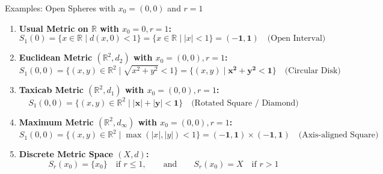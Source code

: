\documentclass[11pt,a4paper]{article}
\begin{document}
\begin{exbox}{Examples: Open Spheres with $x_0 = (0,0)$ and $r = 1$}
\begin{enumerate}
    \item \textbf{Usual Metric on $\mathbb{R}$ with $x_0 = 0, r = 1$:}
    $$S_1(0) = \{ x \in \mathbb{R} \mid d(x, 0) < 1 \} = \{ x \in \mathbb{R} \mid |x| < 1 \} = \mathbf{(-1, 1)} \quad \text{(Open Interval)}$$
    
    \item \textbf{Euclidean Metric $(\mathbb{R}^2, d_2)$ with $x_0 = (0,0), r = 1$:}
    $$S_1(0,0) = \{ (x, y) \in \mathbb{R}^2 \mid \sqrt{x^2 + y^2} < 1 \} = \{ (x, y) \mid \mathbf{x^2 + y^2 < 1} \} \quad \text{(Circular Disk)}$$
    
    \item \textbf{Taxicab Metric $(\mathbb{R}^2, d_1)$ with $x_0 = (0,0), r = 1$:}
    $$S_1(0,0) = \{ (x, y) \in \mathbb{R}^2 \mid \mathbf{|x| + |y| < 1} \} \quad \text{(Rotated Square / Diamond)}$$
    
    \item \textbf{Maximum Metric $(\mathbb{R}^2, d_\infty)$ with $x_0 = (0,0), r = 1$:}
    $$S_1(0,0) = \{ (x, y) \in \mathbb{R}^2 \mid \max(|x|, |y|) < 1 \} = \mathbf{(-1, 1) \times (-1, 1)} \quad \text{(Axis-aligned Square)}$$
    
    \item \textbf{Discrete Metric Space $(X, d)$:}
    $$S_r(x_0) = \{x_0\} \quad \text{if } r \le 1, \qquad \text{and} \qquad S_r(x_0) = X \quad \text{if } r > 1$$
\end{enumerate}
\end{exbox}
\end{document}
